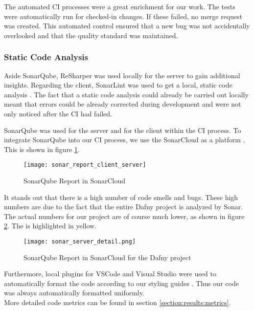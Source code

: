 The automated CI processes were a great enrichment for our work.
The tests were automatically run for checked-in changes.
If these failed, no merge request was created.
This automated control ensured that a new bug was not accidentally overlooked
and that the quality standard was maintained.

\subsubsection{Static Code Analysis}
Aside SonarQube, ReSharper was used locally for the server to gain additional insights.
Regarding the client, SonarLint was used to get a local, static code analysis \cite{sonar-lint}.
The fact that a static code analysis could already be carried out locally meant that errors
could be already corrected during development and were not only noticed after the CI had failed.

SonarQube was used for the server and for the client within the CI process.
To integrate SonarQube into our CI process, we use the SonarCloud as a platform \cite{sonarcloud}.
This is shown in figure \ref{fig:sonarcloud_report}.


\begin{figure}[H]
    \centering
    \texttt{[image: sonar\_report\_client\_server]}
    \caption{SonarQube Report in SonarCloud}
    \label{fig:sonarcloud_report}
\end{figure}

It stands out that there is a high number of code smells and bugs.
These high numbers are due to the fact that the entire Dafny project is analyzed by Sonar.
The actual numbers for our project are of course much lower,
as shown in figure \ref{fig:sonar_server_detail}.
The  is highlighted in yellow.

\begin{figure}[H]
    \centering
    \texttt{[image: sonar\_server\_detail.png]}
    \caption{SonarQube Report in SonarCloud for the Dafny project}
    \label{fig:sonar_server_detail}
\end{figure}

Furthermore, local plugins for VSCode and Visual Studio were used to automatically
format the code according to our styling guides \cite{dev}.
Thus our code was always automatically formatted uniformly. \\ %

More detailed code metrics can be found in section \ref{section:results:metrics}.

